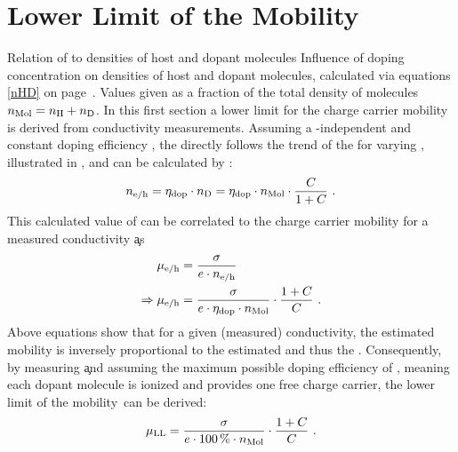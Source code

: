 \section{Lower Limit of the Mobility}\label{sec:rechMobLL}
%
{Relation of \CLong to densities of host and dopant molecules}
{Influence of doping concentration \C on densities of host \nH and dopant \nD molecules, calculated via equations \eqref{nHD} on page~\pageref{eq:nHD}. Values given as a fraction of the total density of molecules $n_\text{Mol}=n_\text{H}+n_\text{D}$.}
%
In this first section a lower limit for the charge carrier mobility \mobLL is derived from conductivity measurements.
Assuming a \C-independent and constant doping efficiency \DopEff, the \nLong \neh directly follows the trend of the \nDLongL for varying \CLong, illustrated in , and can be calculated by :
\begin{equation}
\neh = \DopEff \cdot \nD = \DopEff \cdot \nM \cdot \frac{\C}{1+\C} \label{eq:CCD-from-DopEff-calc}
\PUNKT
\end{equation}
%
This calculated value of \neh can be correlated to the charge carrier mobility \mobeh for a measured conductivity \c as
\begin{align}
\mobeh &= \frac{\c}{e \cdot \neh} \label{eq:Cond-CCD-Mob-calc} \\
\Rightarrow\mobeh &= \frac{\c}{e \cdot \DopEff \cdot \nM} \cdot \frac{1+\C}{\C}
\label{eq:mob-von-DopEff+C}
\PUNKT
\end{align}
Above equations show that for a given (measured) conductivity, the estimated mobility is inversely proportional to the estimated \neh and thus the \DopEff. Consequently, by measuring \c and assuming the maximum possible doping efficiency of \DopEff[100], meaning each dopant molecule is ionized and provides one free charge carrier, the lower limit of the mobility~\mobLL can be derived:
\begin{equation}
\mobLL = \frac{\c}{e \cdot 100\,\% \cdot \nM} \cdot \frac{1+\C}{\C}
\label{eq:mobLL}
\PUNKT
\end{equation}

